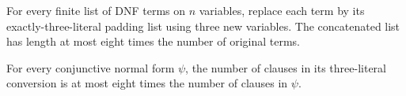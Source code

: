 \begin{theorem}
\label{FABL.length_bind_exactlyThreePadClause_le}
\leanok
{}
For every finite list of DNF terms on $n$ variables, replace each term by its
exactly-three-literal padding list using three new variables. The concatenated list has
length at most eight times the number of original terms.
\end{theorem}

\begin{theorem}
\label{FABL.exactlyThreeCNF_size_le}
\leanok
{}
For every conjunctive normal form $\psi$, the number of clauses in its three-literal
conversion is at most eight times the number of clauses in $\psi$.
\end{theorem}

